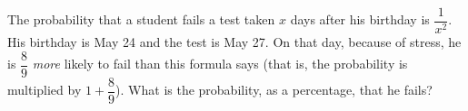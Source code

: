 The probability that a student fails a test taken $x$ days after his birthday is $\dfrac1{x^2}$. His birthday is May 24 and the test is May 27. On that day, because of stress, he is $\dfrac89$ \emph{more} likely to fail than this formula says (that is, the probability is multiplied by $1+\dfrac89$). What is the probability, as a percentage, that he fails?
